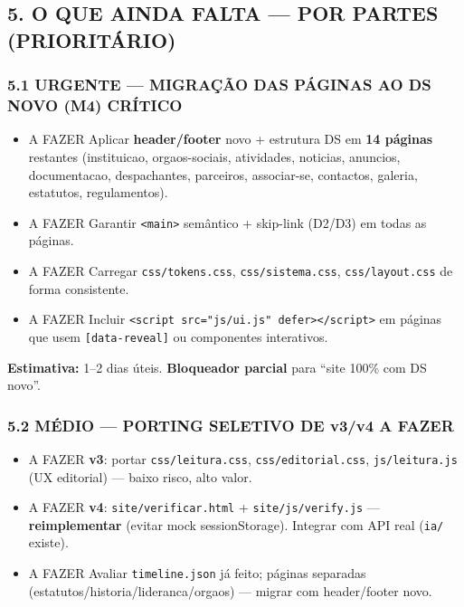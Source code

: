 \subsection{5. O QUE AINDA FALTA --- POR PARTES
(PRIORITÁRIO)}\label{o-que-ainda-falta-por-partes-priorituxe1rio}

\subsubsection{\texorpdfstring{5.1 URGENTE --- MIGRAÇÃO DAS PÁGINAS AO
DS NOVO (M4)
{CRÍTICO}}{5.1 URGENTE --- MIGRAÇÃO DAS PÁGINAS AO DS NOVO (M4) CRÍTICO}}\label{urgente-migrauxe7uxe3o-das-puxe1ginas-ao-ds-novo-m4-cruxedtico}

\begin{itemize}
\tightlist
\item
  {A FAZER} Aplicar \textbf{header/footer} novo + estrutura DS em
  \textbf{14 páginas} restantes (instituicao, orgaos-sociais,
  atividades, noticias, anuncios, documentacao, despachantes, parceiros,
  associar-se, contactos, galeria, estatutos, regulamentos).
\item
  {A FAZER} Garantir \texttt{\textless{}main\textgreater{}} semântico +
  skip-link (D2/D3) em todas as páginas.
\item
  {A FAZER} Carregar \texttt{css/tokens.css}, \texttt{css/sistema.css},
  \texttt{css/layout.css} de forma consistente.
\item
  {A FAZER} Incluir
  \texttt{\textless{}script\ src="js/ui.js"\ defer\textgreater{}\textless{}/script\textgreater{}}
  em páginas que usem \texttt{{[}data-reveal{]}} ou componentes
  interativos.
\end{itemize}

\textbf{Estimativa:} 1--2 dias úteis. \textbf{Bloqueador parcial} para
``site 100\% com DS novo''.

\subsubsection{\texorpdfstring{5.2 MÉDIO --- PORTING SELETIVO DE v3/v4
{A
FAZER}}{5.2 MÉDIO --- PORTING SELETIVO DE v3/v4 A FAZER}}\label{muxe9dio-porting-seletivo-de-v3v4-a-fazer}

\begin{itemize}
\tightlist
\item
  {A FAZER} \textbf{v3}: portar \texttt{css/leitura.css},
  \texttt{css/editorial.css}, \texttt{js/leitura.js} (UX editorial) ---
  baixo risco, alto valor.
\item
  {A FAZER} \textbf{v4}: \texttt{site/verificar.html} +
  \texttt{site/js/verify.js} --- \textbf{reimplementar} (evitar mock
  sessionStorage). Integrar com API real (\texttt{ia/} existe).
\item
  {A FAZER} Avaliar \texttt{timeline.json} já feito; páginas separadas
  (estatutos/historia/lideranca/orgaos) --- migrar com header/footer
  novo.
\end{itemize}

